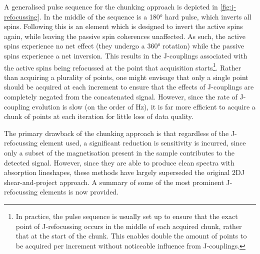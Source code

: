 A generalised pulse sequence for the chunking approach is depicted in
\cref{fig:j-refocussing}. In the middle of the sequence is a \ang{180} hard
pulse, which inverts all spins. Following this is an element which is designed
to invert the active spins again, while leaving the passive spin coherences
unaffected. As such, the active spins experience no net effect (they
undergo a \ang{360} rotation) while the passive spins experience a net inversion.
This results in the J-couplings associated with the active spins being
refocussed at the point that acquisition starts\footnote{
    In practice, the pulse sequence is usually set up to ensure that the exact
    point of J-refocussing occurs in the middle of each acquired chunk, rather
    that at the start of the chunk. This enables double the amount
    of points to be acquired per increment without noticeable influence from
    J-couplings.
}.
Rather than acquiring a plurality of points, one might envisage that only a
single point should be acquired at each increment to
ensure that the effects of J-couplings are completely negated from the
concatenated signal. However, since the rate of J-coupling evolution is
slow (on the order of \unit{\hertz}), it is far more efficient to acquire a
chunk of points at each iteration for little loss of data quality.

The primary drawback of the chunking approach is that regardless of the
J-refocussing element used, a significant reduction is sensitivity is incurred,
since only a subset of the magnetisation present in the sample contributes to
the detected signal. However, since they are able to produce clean
spectra with absorption lineshapes, these methods have largely superseded the
original \ac{2DJ} shear-and-project approach. A summary of some of the most
prominent J-refocussing elements is now provided.

